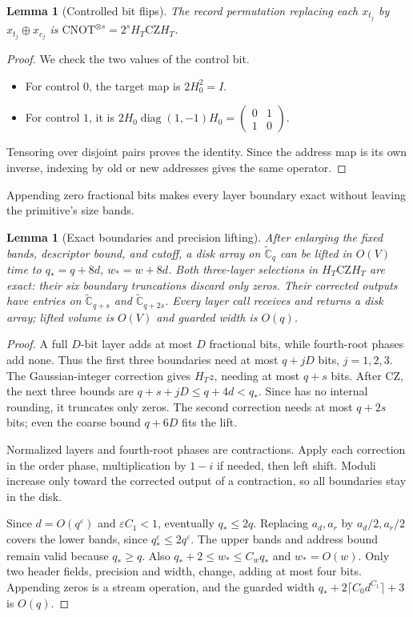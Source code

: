 \documentclass[11pt]{article}
\newtheorem{lemma}[theorem]{Lemma}
\theoremstyle{definition}
\renewcommand{\label}[1]{}%
\newcommand{\Cg}{\widetilde{\mathbb{C}}}
\newcommand{\diag}{\operatorname{diag}}
\newcommand{\CNOT}{\mathrm{CNOT}}
\newcommand{\CZ}{\mathrm{CZ}}
\newcommand{\eps}{\varepsilon}
\begin{document}
\begin{lemma}[Controlled bit flips]\label{lem:cnot}
The record permutation replacing each $x_{t_j}$ by $x_{t_j}\oplus x_{c_j}$
is $\CNOT^{\otimes s}=2^sH_T\CZ H_T$.
\end{lemma}
\begin{proof}
We check the two values of the control bit.
\begin{itemize}[leftmargin=*,nosep]
\item For control $0$, the target map is $2H_0^2=I$.
\item For control $1$, it is
$2H_0\diag(1,-1)H_0=
\left(\begin{smallmatrix}0&1\\1&0\end{smallmatrix}\right)$.
\end{itemize}
Tensoring over disjoint pairs proves the identity.
Since the address map is its own inverse, indexing by old or new addresses gives the same operator.
\end{proof}

Appending zero fractional bits makes every layer boundary exact without leaving the primitive's size bands.

\begin{lemma}[Exact boundaries and precision lifting]\label{lem:lifting}
After enlarging the fixed bands, descriptor bound, and cutoff, a disk array
on $\Cg_q$ can be lifted in $O(V)$ time to $q_*=q+8d$, $w_*=w+8d$.
Both three-layer selections in $H_T\CZ H_T$ are exact: their six boundary
truncations discard only zeros.
Their corrected outputs have entries on $\Cg_{q+s}$ and $\Cg_{q+2s}$.
Every layer call receives and returns a disk array; lifted volume is $O(V)$
and guarded width is $O(q)$.
\end{lemma}
\begin{proof}
A full $D$-bit layer adds at most $D$ fractional bits, while fourth-root phases add none.
Thus the first three boundaries need at most $q+jD$ bits, $j=1,2,3$.
The Gaussian-integer correction gives $H_Tz$, needing at most $q+s$ bits.
After $\CZ$, the next three bounds are $q+s+jD\le q+4d<q_*$.
Since  has no internal rounding, it truncates only zeros.
The second correction needs at most $q+2s$ bits; even the coarse bound $q+6D$ fits the lift.

Normalized layers and fourth-root phases are contractions.
Apply each correction in the order phase, multiplication by $1-i$ if needed, then left shift.
Moduli increase only toward the corrected output of a contraction, so all boundaries stay in the disk.

Since $d=O(q^\eps)$ and $\eps C_1<1$, eventually $q_*\le2q$.
Replacing $a_d,a_r$ by $a_d/2,a_r/2$ covers the lower bands, since $q_*^\eps\le2q^\eps$.
The upper bands and address bound remain valid because $q_*\ge q$.
Also $q_*+2\le w_*\le C_wq_*$ and $w_*=O(w)$.
Only two header fields, precision and width, change, adding at most four bits.
Appending zeros is a stream operation, and the guarded width
$q_*+2\lceil C_0d^{C_1}\rceil+3$ is $O(q)$.
\end{proof}
\end{document}
